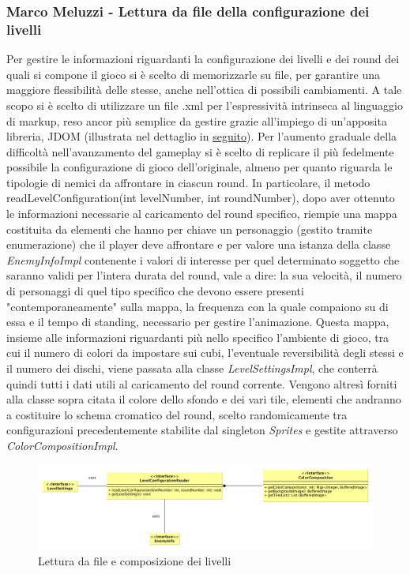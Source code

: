 \documentclass[a4paper,12pt, hidelinks]{report}
\begin{document}
\begin{flushright}
\item\subsubsection{Marco Meluzzi - Lettura da file della configurazione dei livelli}
\end{flushright}

Per gestire le informazioni riguardanti la configurazione dei livelli e dei round dei quali si compone il gioco si è scelto di memorizzarle su file, per garantire una maggiore flessibilità delle stesse, anche nell'ottica di possibili cambiamenti. A tale scopo si è scelto di utilizzare un file .xml per l'espressività intrinseca al linguaggio di markup, reso ancor più semplice da gestire grazie all'impiego di un'apposita libreria, JDOM (illustrata nel dettaglio in \hyperlink{target}{seguito}). Per l'aumento graduale della difficoltà nell'avanzamento del gameplay si è scelto di replicare il più fedelmente possibile la configurazione di gioco dell'originale, almeno per quanto riguarda le tipologie di nemici da affrontare in ciascun round. In particolare, il metodo readLevelConfiguration(int levelNumber, int roundNumber), dopo aver ottenuto le informazioni necessarie al caricamento del round specifico, riempie una mappa costituita da elementi che hanno per chiave un personaggio (gestito tramite enumerazione) che il player deve affrontare e per valore una istanza della classe \emph{EnemyInfoImpl} contenente i valori di interesse per quel determinato soggetto che saranno validi per l'intera durata del round, vale a dire: la sua velocità, il numero di personaggi di quel tipo specifico che devono essere presenti "contemporaneamente" sulla mappa, la frequenza con la quale compaiono su di essa e il tempo di standing, necessario per gestire l'animazione. Questa mappa, insieme alle informazioni riguardanti più nello specifico l'ambiente di gioco, tra cui il numero di colori da impostare sui cubi, l'eventuale reversibilità degli stessi e il numero dei dischi, viene passata alla classe \emph{LevelSettingsImpl}, che conterrà quindi tutti i dati utili al caricamento del round corrente. Vengono altresì forniti alla classe sopra citata il colore dello sfondo e dei vari tile, elementi che andranno a costituire lo schema cromatico del round, scelto randomicamente tra configurazioni precedentemente stabilite dal singleton \emph{Sprites} e gestite attraverso \emph{ColorCompositionImpl}.

\begin{figure}[H]
\centering{}
\includegraphics[width=\linewidth]{img/ComposizioneLivelli}
\caption{Lettura da file e composizione dei livelli}
\label{img:ComposizioneLivelli}
\end{figure}
\end{document}
